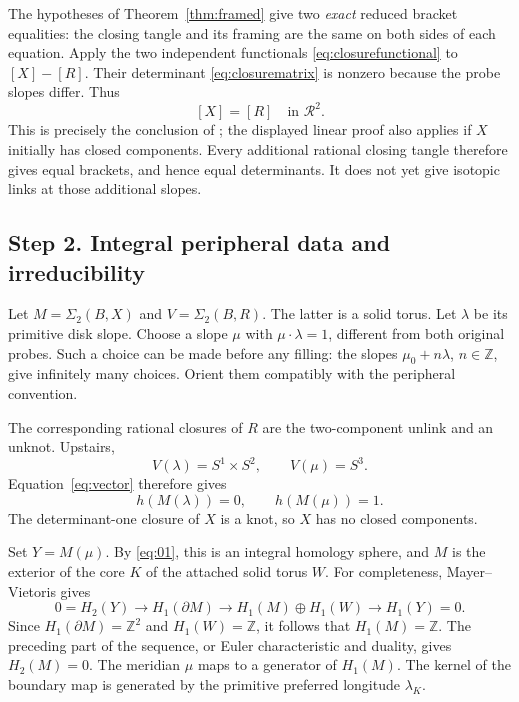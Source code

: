 \documentclass[11pt]{amsart}
\theoremstyle{definition}
\theoremstyle{remark}
\newcommand{\Z}{\mathbb Z}
\newcommand{\bd}{\partial}
\begin{document}
The hypotheses of Theorem~\ref{thm:framed} give two
\emph{exact} reduced bracket equalities: the closing
tangle and its framing are the same on both sides of
each equation. Apply the two independent functionals
\eqref{eq:closurefunctional} to \([X]-[R]\).
Their determinant \eqref{eq:closurematrix} is nonzero
because the probe slopes differ. Thus
\begin{equation}\label{eq:vector}
 [X]=[R]\quad\text{in }\mathcal R^2.
\end{equation}
This is precisely the conclusion of
\cite[Theorem~21]{Sikora}; the displayed linear proof
also applies if \(X\) initially has closed components.
Every additional rational closing tangle therefore
gives equal brackets, and hence equal determinants.
It does not yet give isotopic links at those
additional slopes.

\subsection*{Step 2. Integral peripheral data and irreducibility}

Let \(M=\Sigma_2(B,X)\) and \(V=\Sigma_2(B,R)\).
The latter is a solid torus. Let \(\lambda\) be its
primitive disk slope. Choose a slope \(\mu\) with
\(\mu\cdot\lambda=1\), different from both original
probes. Such a choice can be made before any filling:
the slopes \(\mu_0+n\lambda\), \(n\in\Z\), give
infinitely many choices. Orient them compatibly with
the peripheral convention.

The corresponding rational closures of \(R\) are
the two-component unlink and an unknot. Upstairs,
\[
 V(\lambda)=S^1\times S^2,\qquad V(\mu)=S^3.
\]
Equation~\eqref{eq:vector} therefore gives
\begin{equation}\label{eq:01}
 h(M(\lambda))=0,\qquad h(M(\mu))=1.
\end{equation}
The determinant-one closure of \(X\) is a knot,
so \(X\) has no closed components.

Set \(Y=M(\mu)\). By \eqref{eq:01}, this is an integral
homology sphere, and \(M\) is the exterior of the
core \(K\) of the attached solid torus \(W\).
For completeness, Mayer--Vietoris gives
\[
 0=H_2(Y)\longrightarrow H_1(\bd M)
 \longrightarrow H_1(M)\oplus H_1(W)
 \longrightarrow H_1(Y)=0.
\]
Since \(H_1(\bd M)=\Z^2\) and \(H_1(W)=\Z\), it follows
that \(H_1(M)=\Z\). The preceding part of the sequence,
or Euler characteristic and duality, gives \(H_2(M)=0\).
The meridian \(\mu\) maps to a generator of \(H_1(M)\).
The kernel of the boundary map is generated by the
primitive preferred longitude \(\lambda_K\).
\end{document}
